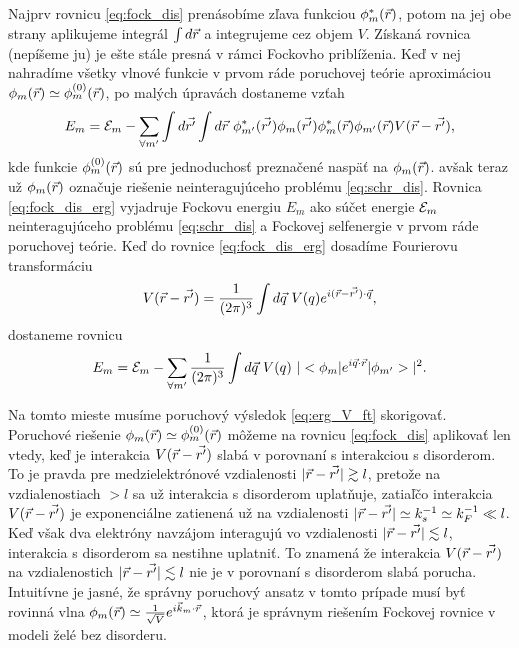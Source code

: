 Najprv rovnicu \eqref{eq:fock_dis} prenásobíme zľava funkciou $\phi^*_{m}(\vec{r})$, potom na jej obe strany aplikujeme integrál $\int d \vec{r}$ a integrujeme cez objem $V$.
Získaná rovnica (nepíšeme ju) je ešte stále presná v rámci Fockovho priblíženia. Keď v nej nahradíme všetky vlnové funkcie v prvom ráde poruchovej teórie aproximáciou
$\phi_m(\vec{r}) \simeq \phi_m^{(0)}(\vec{r})$, po malých úpravách dostaneme vzťah
\begin{equation}
 \label{eq:fock_dis_erg}
 E_m=\E_m-\sum_{\forall m'} \int d\vrp \int d\vr\ \phi^*_{m'}(\vrp) \phi_{m}(\vrp)\phi^*_{m}(\vr)\phi_{m'}(\vr)V(\vr-\vrp) \text{,}
\end{equation}
  kde funkcie
$\phi_m^{(0)}(\vec{r})$ sú pre jednoduchosť preznačené naspäť na $\phi_m(\vec{r})$.
avšak teraz už $\phi_m(\vec{r})$ označuje riešenie neinteragujúceho problému \eqref{eq:schr_dis}.
 Rovnica \eqref{eq:fock_dis_erg}
  vyjadruje Fockovu energiu $E_m$ ako súčet energie $\mathcal{E}_m$ neinteragujúceho problému \eqref{eq:schr_dis}
 a Fockovej selfenergie v prvom ráde poruchovej teórie.
Keď do rovnice \eqref{eq:fock_dis_erg} dosadíme Fourierovu transformáciu
\begin{equation}
 \label{eq:V_ft}
 V(\vr-\vrp)=\ftkvec{(\vr-\vrp)}{\vq}{V(q)}\text{,}
\end{equation}
dostaneme rovnicu
\begin{equation}
\label{eq:erg_V_ft}
 E_m=\E_m-\sum_{\forall m'}\frac{1}{(2\pi)^{3}} \int d\vq\ V(q) \ |\bra{\phi_m}e^{i\vq\cdot\vr}\ket{\phi_{m'}}|^2 \text{.}
\end{equation}

Na tomto mieste musíme poruchový výsledok \eqref{eq:erg_V_ft} skorigovať. Poruchové riešenie
$\phi_m(\vec{r}) \simeq \phi_m^{(0)}(\vec{r})$ môžeme na rovnicu  \eqref{eq:fock_dis} aplikovať len vtedy,
keď je interakcia $V(\vec{r}-\vec{r'})$ slabá v porovnaní s interakciou s disorderom.
To je pravda pre medzielektrónové vzdialenosti $|\vec{r}-\vec{r'}| \gtrsim l$, pretože na vzdialenostiach $>l$ sa už interakcia s disorderom uplatňuje,
zatiaľčo interakcia $V(\vec{r}-\vec{r'})$ je exponenciálne zatienená už na vzdialenosti $|\vec{r}-\vec{r'}| \simeq k_s^{-1} \simeq k_F^{-1} \ll l$.
Keď však dva elektróny navzájom interagujú vo vzdialenosti $|\vec{r}-\vec{r'}| \lesssim l$, interakcia s disorderom sa nestihne uplatniť.
To znamená že interakcia $V(\vec{r}-\vec{r'})$ na vzdialenostich $|\vec{r}-\vec{r'}| \lesssim l$ nie je v porovnaní s disorderom slabá porucha.
Intuitívne je jasné, že správny poruchový ansatz v tomto prípade musí byť rovinná vlna
$\phi_m(\vec{r}) \simeq \frac{1}{\sqrt V}e^{i\vec{k}_m\cdot\vec{r}}$, ktorá je správnym riešením Fockovej rovnice v modeli želé bez disorderu.

